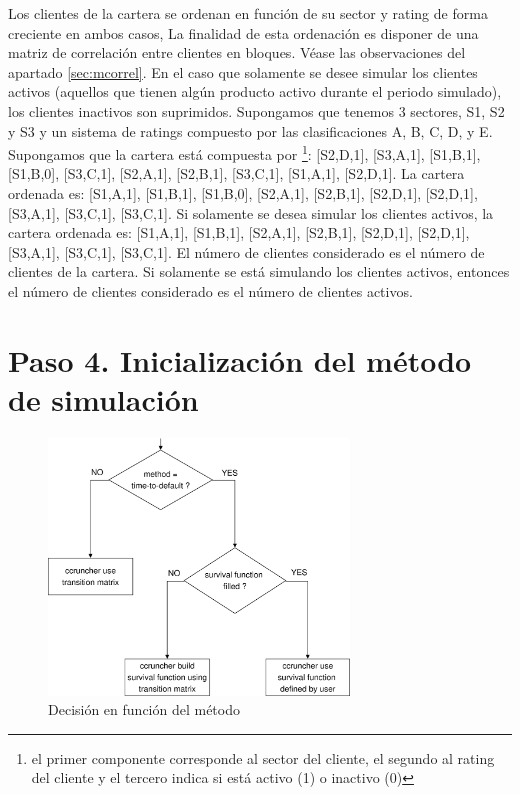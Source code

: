 Los clientes de la cartera se ordenan en funci\'on de su sector
y rating de forma creciente en ambos casos, La finalidad de esta
ordenaci\'on es disponer de una matriz de correlaci\'on entre
clientes en bloques. V\'ease las observaciones del
apartado \ref{sec:mcorrel}. En el caso que solamente se desee simular los
clientes activos (aquellos que tienen alg\'un producto activo durante el periodo
simulado), los clientes inactivos son suprimidos.
\newline
\newline
Supongamos que tenemos 3 sectores, S1, S2 y S3 y un sistema de
ratings compuesto por las clasificaciones A, B, C, D, y E.
Supongamos que la cartera est\'a compuesta por \footnote{el
primer componente corresponde al sector del cliente, el segundo al
rating del cliente y el tercero indica si est\'a activo (1) o inactivo (0)}:
[S2,D,1], [S3,A,1], [S1,B,1], [S1,B,0], [S3,C,1], [S2,A,1], [S2,B,1], [S3,C,1],
[S1,A,1], [S2,D,1].
\newline
\newline
La cartera ordenada es:
[S1,A,1], [S1,B,1], [S1,B,0], [S2,A,1], [S2,B,1], [S2,D,1], [S2,D,1],
[S3,A,1], [S3,C,1], [S3,C,1].
\newline
\newline
Si solamente se desea simular los clientes activos, la cartera ordenada es:
[S1,A,1], [S1,B,1], [S2,A,1], [S2,B,1], [S2,D,1], [S2,D,1], [S3,A,1],
[S3,C,1], [S3,C,1].
\newline
\newline
El n\'umero de clientes considerado es el n\'umero de clientes de la cartera.
Si solamente se est\'a simulando los clientes activos, entonces el n\'umero
de clientes considerado es el n\'umero de clientes activos.


\section{Paso 4. Inicializaci\'on del m\'etodo de simulaci\'on}

\begin{figure}[!hb]
\begin{center}
\includegraphics[width=8cm,angle=0]{./images/decisiontree1.eps}
\caption{Decisi\'on en funci\'on del m\'etodo}
\label{decisiontree1}
\end{center}
\end{figure}

